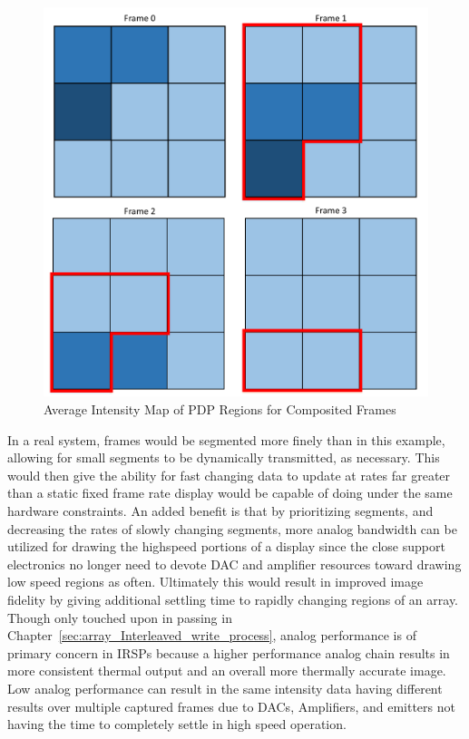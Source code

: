     \begin{figure}
        \centering
        \includegraphics[width=1.0\textwidth]{fig/frames.pdf}
        \caption{Average Intensity Map of PDP Regions for Composited Frames}
        \label{fig:intensity_map}
    \end{figure}

    In a real system, frames would be segmented more finely than in this example, allowing for small segments to be dynamically transmitted, as necessary. This would then give the ability for fast changing data to update at rates far greater than a static fixed frame rate display would be capable of doing under the same hardware constraints. An added benefit is that by prioritizing segments, and decreasing the rates of slowly changing segments, more analog bandwidth can be utilized for drawing the highspeed portions of a display since the close support electronics no longer need to devote DAC and amplifier resources toward drawing low speed regions as often. Ultimately this would result in improved image fidelity by giving additional settling time to rapidly changing regions of an array. Though only touched upon in passing in Chapter~\ref{sec:array_Interleaved_write_process}, analog performance is of primary concern in IRSPs because a higher performance analog chain results in more consistent thermal output and an overall more thermally accurate image. Low analog performance can result in the same intensity data having different results over multiple captured frames due to DACs, Amplifiers, and emitters not having the time to completely settle in high speed operation.
